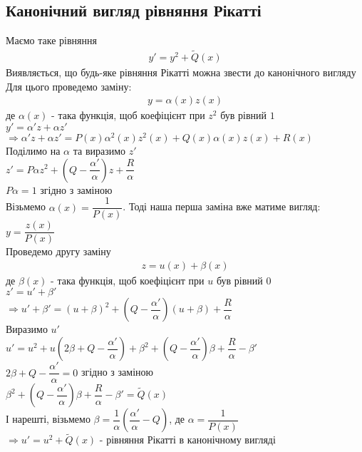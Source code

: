 \documentclass[a4paper, 10pt]{article}
\theoremstyle{theoremdd}
\theoremstyle{theoremdd}
\theoremstyle{theoremdd}
\theoremstyle{theoremdd}
\theoremstyle{theoremdd}
\theoremstyle{theoremdd}
\theoremstyle{theoremdd}
\theoremstyle{theoremdd}
\begin{document}
\subsection{Канонічний вигляд рівняння Рікатті}
Маємо таке рівняння
\begin{align*}
y' = y^2 + \tilde{Q}(x)
\end{align*}
Виявляється, що будь-яке рівняння Рікатті можна звести до канонічного вигляду\\
Для цього проведемо заміну:
\begin{align*}
y = \alpha(x) z(x)
\end{align*}
де $\alpha(x)$ - така функція, щоб коефіцієнт при $z^2$ був рівний $1$\\
$y' = \alpha'z + \alpha z'$\\
$\Rightarrow \alpha'z + \alpha z' = P(x) \alpha^2(x) z^2(x) + Q(x) \alpha(x) z(x) + R(x)$\\
Поділимо на $\alpha$ та виразимо $z'$\\
$z' = P \alpha z^2 + \left(Q - \dfrac{\alpha'}{\alpha} \right)z + \dfrac{R}{\alpha}$\\
$P \alpha = 1$ згідно з заміною\\
Візьмемо $\alpha(x) = \dfrac{1}{P(x)}$. Тоді наша перша заміна вже матиме вигляд:\\
$y = \dfrac{z(x)}{P(x)}$\\
Проведемо другу заміну
\begin{align*}
z = u(x) + \beta(x)
\end{align*}
де $\beta(x)$ - така функція, щоб коефіцієнт при $u$ був рівний $0$\\
$z' = u' + \beta'$\\
$\Rightarrow u' + \beta' = (u+\beta)^2 + \left(Q - \dfrac{\alpha'}{\alpha} \right)(u+\beta) + \dfrac{R}{\alpha}$\\
Виразимо $u'$\\
$u' = u^2 + u \left( 2\beta + Q - \dfrac{\alpha'}{\alpha} \right) + \beta^2 + \left(Q - \dfrac{\alpha'}{\alpha} \right) \beta + \dfrac{R}{\alpha} - \beta'$\\
$2\beta + Q - \dfrac{\alpha'}{\alpha} = 0$ згідно з заміною\\
$\beta^2 + \left( Q - \dfrac{\alpha'}{\alpha} \right)\beta + \dfrac{R}{\alpha} - \beta' = \tilde{Q}(x)$\\
І нарешті, візьмемо $\beta = \dfrac{1}{\alpha} \left( \dfrac{\alpha'}{\alpha} - Q \right)$, де $\alpha = \dfrac{1}{P(x)}$\\
$\Rightarrow u' = u^2 + \tilde{Q}(x)$ - рівняння Рікатті в канонічному вигляді
\end{document}
